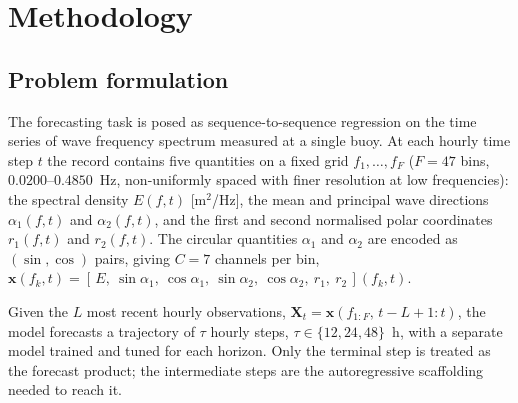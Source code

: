 \section{Methodology}
\label{sec:methods}

\subsection{Problem formulation}
\label{sec:problem}

The forecasting task is posed as sequence-to-sequence regression on the time series of wave frequency spectrum measured at a single buoy. At each hourly time step $t$ the record contains five quantities on a fixed grid $f_1,\dots,f_F$ ($F=47$ bins, $0.0200$--$0.4850$~Hz, non-uniformly spaced with finer resolution at low frequencies): the spectral density $E(f,t)$ [m$^2$/Hz], the mean and principal wave directions $\alpha_1(f,t)$ and $\alpha_2(f,t)$, and the first and second normalised polar coordinates $r_1(f,t)$ and $r_2(f,t)$. The circular quantities $\alpha_1$ and $\alpha_2$ are encoded as $(\sin,\cos)$ pairs, giving $C=7$ channels per bin,
$\mathbf{x}(f_k,t) = [\,E,\ \sin\alpha_1,\ \cos\alpha_1,\ \sin\alpha_2,\ \cos\alpha_2,\ r_1,\ r_2\,](f_k,t)$.
 
Given the $L$ most recent hourly observations, $\mathbf{X}_t = \mathbf{x}(f_{1:F},\, t-L+1{:}t)$, the model forecasts a trajectory of $\tau$ hourly steps, $\tau \in \{12, 24, 48\}$~h, with a separate model trained and tuned for each horizon. Only the terminal step is treated as the forecast product; the intermediate steps are the autoregressive scaffolding needed to reach it.

